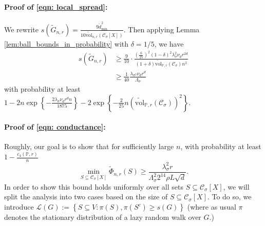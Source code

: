 \documentclass[11pt,twoside]{article}
\newcommand{\set}[1]{\left\{#1\right\}}
\newcommand{\vol}{\mathrm{vol}}
\newcommand{\1}{\mathbf{1}}
\newcommand{\Xbf}{X}             %
\newcommand{\Pbb}{\mathbb{P}}
\newcommand{\Cset}{\mathcal{C}}
\newcommand{\Csig}{\Cset_{\sigma}}
\newcommand{\degminwt}{\widetilde{d}_{\min}}
\begin{document}
\paragraph{Proof of \eqref{eqn: local_spread}:}

We rewrite $s(\widetilde{G}_{n,r}) = \frac{9 \degminwt^2}{10\widetilde{\vol}_{n,r}(\Csig[\Xbf])}$. Then applying Lemma \ref{lem:ball_bounds_in_probability} with $\delta = 1/5$, we have
\begin{align*}
s(\widetilde{G}_{n,r}) & \geq \frac{9}{10} \cdot \frac{\left(\frac{6}{25}\right)^2 (1 - \delta)^2 \lambda_{\sigma}^2 \nu_d r^{2d}}{(1 + \delta)\widetilde{\vol}_{\Pbb,r}(\Csig)n^2} \\
& \geq \frac{1}{40} \frac{\lambda_{\sigma^2} \nu_d r^{d}}{\Lambda_{\sigma}}
\end{align*}
with probability at least $1 - 2n\exp\set{-\frac{2\lambda_{\sigma} \nu_d r^d n}{1875}} - 2\exp\set{-\frac{2}{25}n(\widetilde{\vol}_{\Pbb,r}(\Csig))^2}$. 

\paragraph{Proof of \eqref{eqn: conductance}:}

Roughly, our goal is to show that for sufficiently large $n$, with probability at least $1 - \frac{c_4(\Pbb,r)}{n}$
\begin{equation*}
\min_{S \subseteq \Csig[\Xbf]} \widetilde{\Phi}_{n,r}(S) \geq \frac{\lambda_{\sigma}^2 r}{\Lambda_{\sigma}^2 2^{14} \rho L \sqrt{d}}.
\end{equation*}
In order to show this bound holds uniformly over all sets $S \subseteq \Csig[\Xbf]$, we will split the analysis into two cases based on the size of $S \subseteq \Csig[\Xbf]$. To do so, we introduce $\mathcal{L}(G) := \set{S \subseteq V: \pi(S), \pi(S^c) \geq s(G)}$ (where as usual $\pi$ denotes the stationary distribution of a lazy random walk over $G$.)
\end{document}
